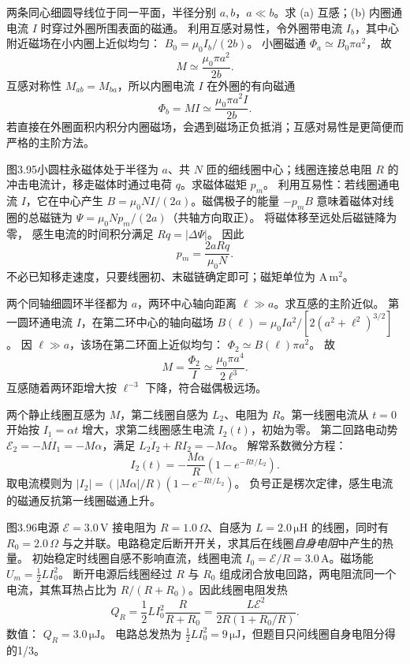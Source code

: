 两条同心细圆导线位于同一平面，半径分别 $a,b$，$a\ll b$。求 (a) 互感；(b) 内圈通电流 $I$ 时穿过外圈所围表面的磁通。
\exsolution
利用互感对易性，令外圈带电流 $I_b$，其中心附近磁场在小内圈上近似均匀：
$B_0=\mu_0I_b/(2b)$。
小圈磁通
$\Phi_a\simeq B_0\pi a^2$，
故
\[
\boxed{M\simeq\frac{\mu_0\pi a^2}{2b}}.
\]
互感对称性 $M_{ab}=M_{ba}$，所以内圈电流 $I$ 在外圈的有向磁通
\[
\boxed{\Phi_b=MI\simeq\frac{\mu_0\pi a^2I}{2b}}.
\]
\excheck 若直接在外圈面积内积分内圈磁场，会遇到磁场正负抵消；互感对易性是更简便而严格的主阶方法。

图3.95小圆柱永磁体处于半径为 $a$、共 $N$ 匝的细线圈中心；线圈连接总电阻 $R$ 的冲击电流计，移走磁体时通过电荷 $q$。求磁体磁矩 $p_m$。
\exsolution
利用互易性：若线圈通电流 $I$，它在中心产生
$B=\mu_0NI/(2a)$。磁偶极子的能量 $-p_mB$ 意味着磁体对线圈的总磁链为
$\Psi=\mu_0Np_m/(2a)$（共轴方向取正）。
将磁体移至远处后磁链降为零，
感生电流的时间积分满足
$Rq=|\Delta\Psi|$。
因此
\[
\boxed{p_m=\frac{2aRq}{\mu_0N}}.
\]
\excheck 不必已知移走速度，只要线圈初、末磁链确定即可；磁矩单位为 $\mathrm{A\,m^2}$。

两个同轴细圆环半径都为 $a$，两环中心轴向距离 $\ell\gg a$。求互感的主阶近似。
\exsolution
第一圆环通电流 $I$，在第二环中心的轴向磁场
$B(\ell)=\mu_0Ia^2/[2(a^2+\ell^2)^{3/2}]$。
因 $\ell\gg a$，该场在第二环面上近似均匀：
$\Phi_2\simeq B(\ell)\pi a^2$。
故
\[
\boxed{M=\frac{\Phi_2}I
\simeq\frac{\mu_0\pi a^4}{2\ell^3}}.
\]
\excheck 互感随着两环距增大按 $\ell^{-3}$ 下降，符合磁偶极远场。

两个静止线圈互感为 $M$，第二线圈自感为 $L_2$、电阻为 $R$。第一线圈电流从 $t=0$ 开始按 $I_1=\alpha t$ 增大，求第二线圈感生电流 $I_2(t)$，初始为零。
\exsolution
第二回路电动势
$\mathcal E_2=-M\dot I_1=-M\alpha$，满足
$L_2\dot I_2+RI_2=-M\alpha$。
解常系数微分方程：
\[
\boxed{I_2(t)=-\frac{M\alpha}{R}
\left(1-e^{-Rt/L_2}\right)}.
\]
取电流模则为
$|I_2|=(|M\alpha|/R)(1-e^{-Rt/L_2})$。
\excheck 负号正是楞次定律，感生电流的磁通反抗第一线圈磁通上升。

图3.96电源 $\mathcal E=3.0\,\mathrm V$ 接电阻为 $R=1.0\,\Omega$、自感为 $L=2.0\,\mathrm{\mu H}$ 的线圈，同时有 $R_0=2.0\,\Omega$ 与之并联。电路稳定后断开开关，求其后在线圈\emph{自身电阻}中产生的热量。
\exsolution
初始稳定时线圈自感不影响直流，线圈电流
$I_0=\mathcal E/R=3.0\,\mathrm A$。磁场能
$U_m=\frac12LI_0^2$。
断开电源后线圈经过 $R$ 与 $R_0$ 组成闭合放电回路，两电阻流同一个电流，其焦耳热占比为 $R/(R+R_0)$。因此线圈电阻发热
\[
Q_R=\frac12LI_0^2\frac{R}{R+R_0}
=\frac{L\mathcal E^2}{2R(1+R_0/R)}.
\]
数值：
$\boxed{Q_R=3.0\,\mathrm{\mu J}}$。
\excheck 电路总发热为 $\frac12LI_0^2=9\,\mathrm{\mu J}$，但题目只问线圈自身电阻分得的1/3。

